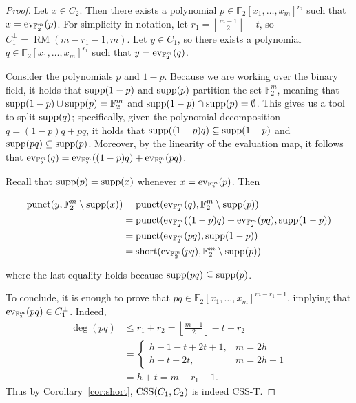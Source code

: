 \documentclass{amsart}
\theoremstyle{definition}
\newcommand{\F}{{\mathbb{F}}}
\newcommand{\floor}[1]{\left\lfloor#1\right\rfloor}
\newcommand{\polyring}[1]{\F_2[x_1,\dots,x_m]^{#1}}
\newcommand{\ev}{\textnormal{ev}_{\F_2^m}}
\newcommand{\short}{\textnormal{short}}
\newcommand{\punct}{\textnormal{punct}}
\newcommand{\supp}{\textnormal{supp}}
\newcommand{\CSS}{\textnormal{CSS}}
\DeclareMathOperator{\RM}{RM}
\begin{document}
\begin{proof}
Let $x\in C_2$. Then there exists a polynomial $p\in \polyring{r_2}$ such that $x=\ev(p)$. For simplicity in notation, let $r_1=\floor{\frac{m-1}{2}} - t$, so $C_1^\perp=\RM(m-r_1-1,m)$. Let $y\in C_1$, so there exists a polynomial $q\in \polyring{r_1}$ such that $y=\ev(q)$. 

Consider the polynomials $p$ and $1-p$. Because we are working over the binary field, it holds that $\supp(1-p)$ and $\supp(p)$ partition the set $\F_2^m$, meaning that $\supp(1-p)\cup \supp(p)=\F_2^m$ and $\supp(1-p)\cap \supp(p)=\emptyset$. This gives us a tool to split $\supp(q)$; specifically, given the polynomial decomposition $q=(1-p)q+pq$, it holds that $\supp((1-p)q)\subseteq \supp(1-p)$ and $\supp(pq)\subseteq \supp(p)$. Moreover, by the linearity of the evaluation map, it follows that $\ev(q)=\ev((1-p)q)+\ev(pq)$. 

Recall that $\supp(p)=\supp(x)$ whenever $x=\ev(p)$. Then

\begin{align*}
    \punct(y,\F_2^m\setminus \supp(x))&= \punct(\ev(q),\F_2^m\setminus \supp(p))\\
    &= \punct(\ev((1-p)q)+\ev(pq),\supp(1-p))\\
    &= \punct(\ev(pq), \supp(1-p))\\&=\short(\ev(pq),\F_2^m\setminus \supp(p))
\end{align*}

where the last equality holds because $\supp(pq)\subseteq \supp(p)$.

To conclude, it is enough to prove that $pq\in\polyring{m-r_1-1}$, implying that $\ev(pq)\in C_1^\perp$. Indeed, 
\begin{align*}
    \deg(pq)&\leq r_1+r_2 = \floor{\frac{m-1}{2}} - t +r_2\\
    &=\begin{cases}
        h-1-t+2t+1, & m=2h \\ 
        h-t+2t, & m=2h+1
    \end{cases}\\
    &=h+t=m-r_1-1.
\end{align*}
Thus by Corollary~\ref{cor:short}, $\CSS(C_1,C_2)$ is indeed CSS-T.
\end{proof}
\end{document}
